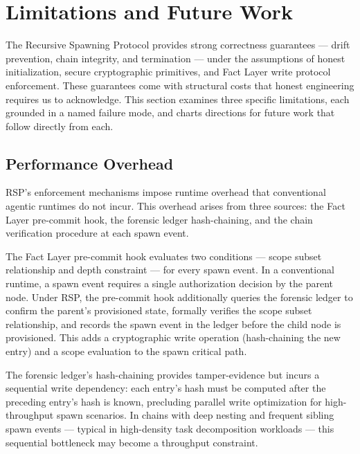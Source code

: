 \section{Limitations and Future Work}
\label{sec:rs-limitations}

The Recursive Spawning Protocol provides strong correctness guarantees — drift prevention, chain integrity, and termination — under the assumptions of honest initialization, secure cryptographic primitives, and Fact Layer write protocol enforcement. These guarantees come with structural costs that honest engineering requires us to acknowledge. This section examines three specific limitations, each grounded in a named failure mode, and charts directions for future work that follow directly from each.

\subsection{Performance Overhead}
\label{sec:rs-limitations-overhead}

RSP's enforcement mechanisms impose runtime overhead that conventional agentic runtimes do not incur. This overhead arises from three sources: the Fact Layer pre-commit hook, the forensic ledger hash-chaining, and the chain verification procedure at each spawn event.

The Fact Layer pre-commit hook evaluates two conditions — scope subset relationship and depth constraint — for every spawn event. In a conventional runtime, a spawn event requires a single authorization decision by the parent node. Under RSP, the pre-commit hook additionally queries the forensic ledger to confirm the parent's provisioned state, formally verifies the scope subset relationship, and records the spawn event in the ledger before the child node is provisioned. This adds a cryptographic write operation (hash-chaining the new entry) and a scope evaluation to the spawn critical path.

The forensic ledger's hash-chaining provides tamper-evidence but incurs a sequential write dependency: each entry's hash must be computed after the preceding entry's hash is known, precluding parallel write optimization for high-throughput spawn scenarios. In chains with deep nesting and frequent sibling spawn events — typical in high-density task decomposition workloads — this sequential bottleneck may become a throughput constraint.

